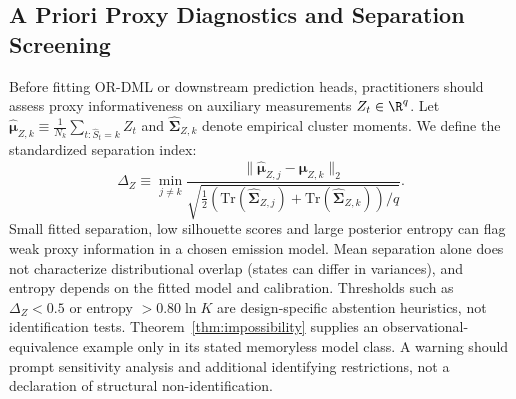 \subsection{A Priori Proxy Diagnostics and Separation Screening}
\label{app:proxy_diagnostics}
Before fitting OR-DML or downstream prediction heads, practitioners should assess proxy informativeness on auxiliary measurements $Z_t \in \R^q$. Let $\hat{\boldsymbol{\mu}}_{Z,k} \equiv \frac{1}{N_k}\sum_{t: \hat{S}_t=k} Z_t$ and $\hat{\boldsymbol{\Sigma}}_{Z,k}$ denote empirical cluster moments. We define the standardized separation index:
\begin{equation}
    \Delta_Z \equiv \min_{j \neq k} \frac{\|\hat{\boldsymbol{\mu}}_{Z,j} - \hat{\boldsymbol{\mu}}_{Z,k}\|_2}{\sqrt{\frac{1}{2}(\mathrm{Tr}(\hat{\boldsymbol{\Sigma}}_{Z,j}) + \mathrm{Tr}(\hat{\boldsymbol{\Sigma}}_{Z,k}))/q}}.
\end{equation}
Small fitted separation, low silhouette scores and large posterior entropy can flag weak proxy information in a chosen emission model. Mean separation alone does not characterize distributional overlap (states can differ in variances), and entropy depends on the fitted model and calibration. Thresholds such as $\Delta_Z<0.5$ or entropy $>0.80\ln K$ are design-specific abstention heuristics, not identification tests. Theorem~\ref{thm:impossibility} supplies an observational-equivalence example only in its stated memoryless model class. A warning should prompt sensitivity analysis and additional identifying restrictions, not a declaration of structural non-identification.



